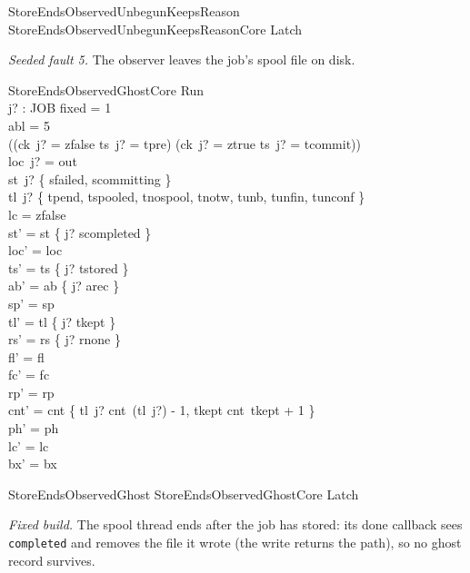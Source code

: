 \documentclass[a4paper,10pt,fleqn]{article}
\newcommand{\field}[1]{\texttt{#1}}
\begin{document}
\begin{zed}
StoreEndsObservedUnbegunKeepsReason  StoreEndsObservedUnbegunKeepsReasonCore \land Latch
\end{zed}

\emph{Seeded fault 5.} The observer leaves the job's spool file on disk.

\begin{schema}{StoreEndsObservedGhostCore}
\Delta Run \\ j? : JOB
\where
fixed = 1 \\
abl = 5 \\
((ck~j? = zfalse \land ts~j? = tpre) \lor (ck~j? = ztrue \land ts~j? = tcommit)) \\
loc~j? = out \\
st~j? \in \{ sfailed, scommitting \} \\
tl~j? \in \{ tpend, tspooled, tnospool, tnotw, tunb, tunfin, tunconf \} \\
lc = zfalse \\
st' = st \oplus \{ j? \mapsto scompleted \} \\
loc' = loc \\
ts' = ts \oplus \{ j? \mapsto tstored \} \\
ab' = ab \oplus \{ j? \mapsto arec \} \\
sp' = sp \\
tl' = tl \oplus \{ j? \mapsto tkept \} \\
rs' = rs \oplus \{ j? \mapsto rnone \} \\
fl' = fl \\
fc' = fc \\
rp' = rp \\
cnt' = cnt \oplus \{ tl~j? \mapsto cnt~(tl~j?) - 1, tkept \mapsto cnt~tkept + 1 \} \\
ph' = ph \\
lc' = lc \\
bx' = bx
\end{schema}

\begin{zed}
StoreEndsObservedGhost  StoreEndsObservedGhostCore \land Latch
\end{zed}

\emph{Fixed build.} The spool thread ends after the job has stored: its done
callback sees \field{completed} and removes the file it wrote (the write returns
the path), so no ghost record survives.
\end{document}
